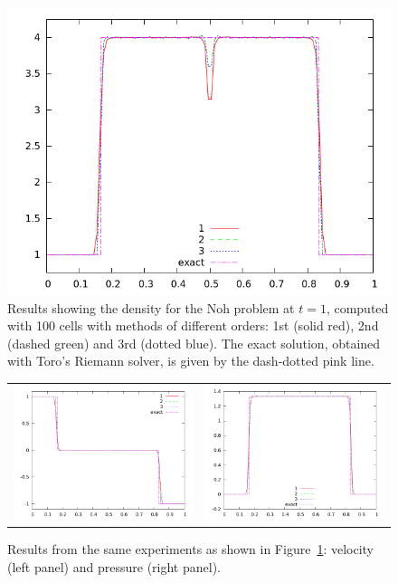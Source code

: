 \documentclass[10pt]{article}
\begin{document}
\begin{figure}[h]
  \begin{center}
     \includegraphics[width=.95\textwidth]{den_T4.png}	
  \end{center}
  \caption{Results showing the density for the Noh problem at $t=1$, computed with 100 cells with methods of different orders: 1st (solid red), 2nd (dashed green) and 3rd (dotted blue). The exact solution, obtained with Toro's Riemann solver, is given by the dash-dotted pink line.}
  \label{fig:den_T4}
\end{figure}

\begin{figure}
  \begin{center}
	\begin{tabular}{cc}
      \includegraphics[width=.475\textwidth]{vel_T4.png} &
	  \includegraphics[width=.475\textwidth]{prs_T4.png}
	\end{tabular}
  \end{center}
  \caption{Results from the same experiments as shown in Figure~\ref{fig:den_T4}:
  velocity (left panel) and pressure (right panel).}
\end{figure}
\end{document}
